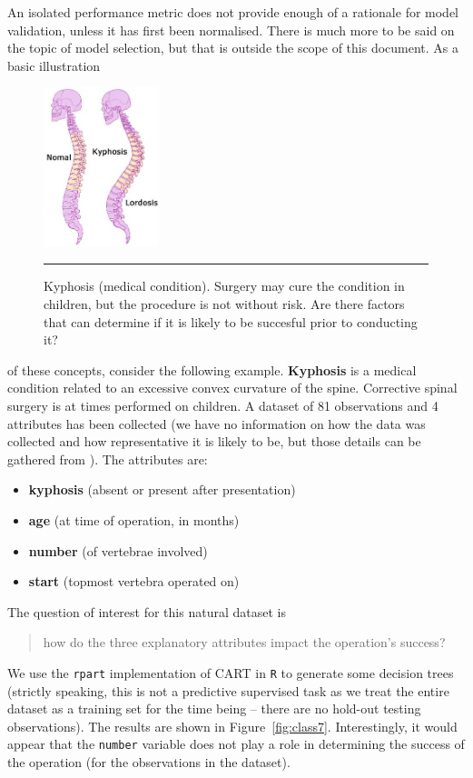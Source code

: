 An isolated performance metric does not provide enough of a rationale for model validation, unless it has first been normalised. There is much more to be said on the topic of model selection, but that is outside the scope of this document.  
\newpage\noindent As a basic illustration
\begin{figure}[!t]
\centering
\includegraphics[width=0.3\textwidth]{images/DSML/kyphosis.png}
\caption[\small Kyphosis (medical condition)]{\small Kyphosis (medical condition). Surgery may cure the condition in children, but the procedure is not without risk. Are there factors that can determine if it is likely to be succesful prior to conducting it?}\hrule\label{fig:class6}
\end{figure}
\afterpage{\FloatBarrier}
of these concepts, consider the following example. \textbf{Kyphosis} is a medical condition related to an excessive convex curvature of the spine. Corrective spinal surgery is at times performed on children. A dataset of 81 observations and 4 attributes has been collected  (we have no information on how the data was collected and how representative it is likely to be, but those details can be gathered from \cite{DSML_HC}).  The attributes are:
\begin{itemize}[noitemsep]
\item \textbf{kyphosis} (absent or present after presentation)
\item \textbf{age} (at time of operation, in months)
\item \textbf{number} (of vertebrae involved)
\item \textbf{start} (topmost vertebra operated on)
\end{itemize}
The question of interest for this natural dataset is 
\begin{quote} how do the three explanatory attributes impact the operation's success?
\end{quote} 
We use the \texttt{rpart} implementation of CART in \texttt{R} to generate some decision trees (strictly speaking, this is not a predictive supervised task as we treat the entire dataset as a training set for the time being -- there are no hold-out testing observations). The results are shown in Figure~\ref{fig:class7}. Interestingly, it would appear that the \texttt{number} variable does not play a role in determining the success of the operation (for the observations in the dataset). 
